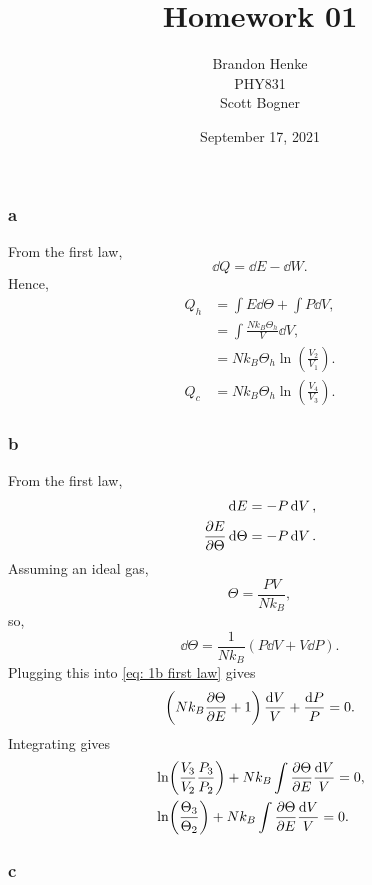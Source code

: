 \documentclass[a4paper,12pt,twoside]{article}
\title{Homework 01}
\author{Brandon Henke\\PHY831\\Scott Bogner}
\date{September 17, 2021}
\begin{document}

\maketitle
\begin{multicols*}{2}


\subsection{}%
\subsubsection*{a}
From the first law,
\begin{equation}
	\dd{Q} = \dd{E} - \dd{W}.
\end{equation}
Hence,
\begin{align}
	Q_h &= \int E\dd{\Theta} + \int P \dd{V},\\
	&= \int \frac{Nk_B\Theta_h}{V}\dd{V},\\
	&= Nk_B\Theta_h \ln(\frac{V_2}{V_1}).\\
	Q_c &= Nk_B\Theta_h \ln(\frac{V_4}{V_3}).
\end{align}
\subsubsection*{b}
From the first law,
\begin{align}
	\dd{E} &= -P\dd{V},\\
	\pdv{E}{\Theta}\dd{\Theta} &= -P\dd{V}.
	\label{eq: 1b first law}
\end{align}
Assuming an ideal gas,
\begin{equation}
	\Theta = \frac{PV}{Nk_B},
\end{equation}
so,
\begin{equation}
	\dd{\Theta} = \frac{1}{Nk_B}\left( P\dd{V}+V\dd{P} \right).
\end{equation}
Plugging this into \ref{eq: 1b first law} gives
\begin{equation}
	\left( Nk_B\pdv{\Theta}{E}+1 \right) \frac{\dd{V}}{V}+\frac{\dd{P}}{P} = 0.
\end{equation}
Integrating gives
\begin{align}
	&\ln(\frac{V_3}{V_2}\frac{P_3}{P_2}) + Nk_B \int \pdv{\Theta}{E} \frac{\dd{V}}{V} = 0,\\
	&\ln(\frac{\Theta_3}{\Theta_2}) + Nk_B \int \pdv{\Theta}{E} \frac{\dd{V}}{V} = 0.
\end{align}
\subsubsection*{c}

\end{multicols*}
\end{document}
